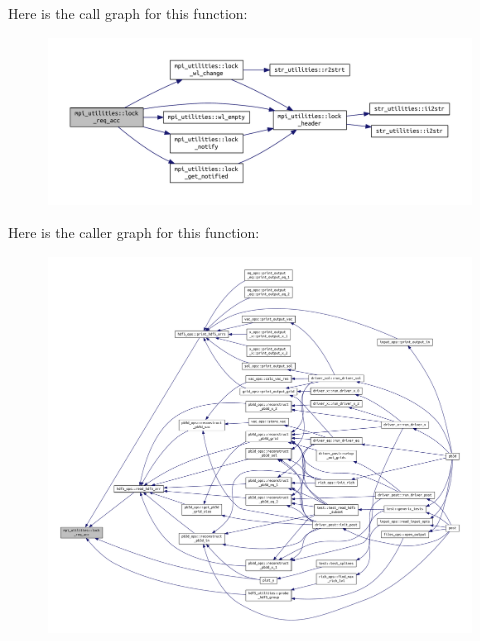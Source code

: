 Here is the call graph for this function\+:\nopagebreak
\begin{figure}[H]
\begin{center}
\leavevmode
\includegraphics[width=350pt]{namespacempi__utilities_a5a789d05be41d6109c01f46cc98620c8_cgraph}
\end{center}
\end{figure}
Here is the caller graph for this function\+:\nopagebreak
\begin{figure}[H]
\begin{center}
\leavevmode
\includegraphics[width=350pt]{namespacempi__utilities_a5a789d05be41d6109c01f46cc98620c8_icgraph}
\end{center}
\end{figure}
\mbox{\label{namespacempi__utilities_a86f9982a0f92b51a916f832d9a3d8ba9}} 
